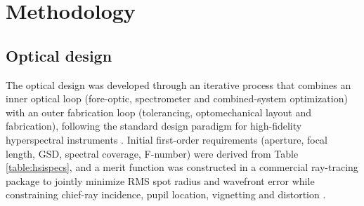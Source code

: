 \documentclass{iac}
\begin{document}
\section{Methodology}
\subsection{Optical design}
The optical design was developed through an iterative process that combines an inner optical loop (fore-optic, spectrometer and combined-system optimization) with an outer fabrication loop (tolerancing, optomechanical layout and fabrication), following the standard design paradigm for high-fidelity hyperspectral instruments \cite{mouroulis2018review,middleton2022holistic}. Initial first-order requirements (aperture, focal length, GSD, spectral coverage, F-number) were derived from Table \ref{table:hsispecs}, and a merit function was constructed in a commercial ray-tracing package to jointly minimize RMS spot radius and wavefront error while constraining chief-ray incidence, pupil location, vignetting and distortion \cite{smith2008modern}.
\end{document}
